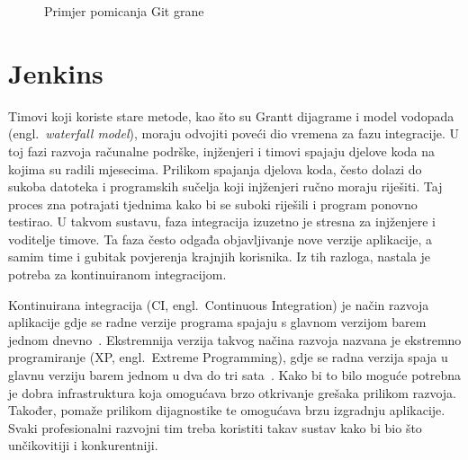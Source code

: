 \begin{figure}[h]
    \centering

    \caption{Primjer pomicanja Git grane}%
    \label{fig:02gitexample2}
\end{figure}

\section{Jenkins}
Timovi koji koriste stare metode, kao što su Grantt dijagrame i model vodopada
(engl.~\textit{waterfall model}), moraju odvojiti poveći dio vremena za fazu integracije. U toj fazi
razvoja računalne podrške, injženjeri i timovi spajaju djelove koda na kojima su radili mjesecima.
Prilikom spajanja djelova koda, često dolazi do sukoba datoteka i programskih sučelja koji
injženjeri ručno moraju riješiti. Taj proces zna potrajati tjednima kako bi se suboki riješili i
program ponovno testirao. U takvom sustavu, faza integracija izuzetno je stresna za injženjere i
voditelje timove. Ta faza često odgađa objavljivanje nove verzije aplikacije, a samim time i gubitak
povjerenja krajnjih korisnika. Iz tih razloga, nastala je potreba za kontinuiranom integracijom.

Kontinuirana integracija (CI, engl.~Continuous Integration) je način razvoja aplikacije gdje se
radne verzije programa spajaju s glavnom verzijom barem jednom dnevno~\citep{fowler2006continuous}.
Ekstremnija verzija takvog načina razvoja nazvana je ekstremno programiranje (XP, engl.~Extreme
Programming), gdje se radna verzija spaja u glavnu verziju barem jednom u dva do tri
sata~\citep{beck1999embracing}. Kako bi to bilo moguće potrebna je dobra infrastruktura koja
omogućava brzo otkrivanje grešaka prilikom razvoja. Također, pomaže prilikom dijagnostike te
omogućava brzu izgradnju aplikacije. Svaki profesionalni razvojni tim treba koristiti takav sustav
kako bi bio što unčikovitiji i konkurentniji.

